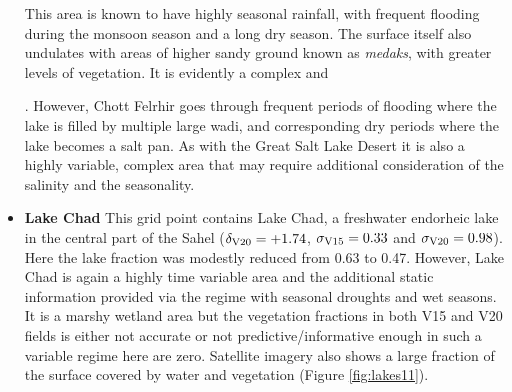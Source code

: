 \documentclass[hess, twostagejnl]{copernicus}
\providecommand{\DIFadd}[1]{{\protect\color{blue} \sf #1}} %
\providecommand{\DIFdel}[1]{{\protect\color{red} \scriptsize #1}} %
\providecommand{\DIFaddbegin}{} %
\providecommand{\DIFaddend}{} %
\providecommand{\DIFdelbegin}{} %
\providecommand{\DIFdelend}{} %
\begin{document}
\begin{itemize}
{This area is known to have highly seasonal rainfall, with frequent flooding during the monsoon season and a long dry season. The surface itself also undulates with areas of higher sandy ground known as \textit{medaks}, with greater levels of vegetation. It is evidently a complex and }\DIFdelend \DIFaddbegin \DIFadd{. However, Chott Felrhir goes through frequent periods of flooding where the lake is filled by multiple large wadi, and corresponding dry periods where the lake becomes a salt pan. As with the Great Salt Lake Desert it is also a highly variable, complex area that may require additional consideration of the salinity and the seasonality.  
	
}

	
	\item \DIFadd{\textbf{Lake Chad} This grid point contains Lake Chad, a freshwater endorheic lake in the central part of the Sahel ($\delta_{\rm V20} = +1.74$, $\sigma_{\rm V15} = 0.33$ and $\sigma_{\rm V20}=0.98$). Here the lake fraction was modestly reduced from 0.63 to 0.47. However, Lake Chad is again a }\DIFaddend highly time variable \DIFdelbegin \DIFdel{area and the additional static information provided via the }\DIFdelend \DIFaddbegin \DIFadd{regime with seasonal droughts and wet seasons. It is a marshy wetland area but the vegetation fractions in both V15 and }\DIFaddend V20 \DIFdelbegin \DIFdel{fields is either not accurate or not predictive/informative enough in such a variable regime}\DIFdelend \DIFaddbegin \DIFadd{here are zero. Satellite imagery also shows a large fraction of the surface covered by water and vegetation (Figure \ref{fig:lakes11})}\DIFaddend .



\end{itemize}
\end{document}
